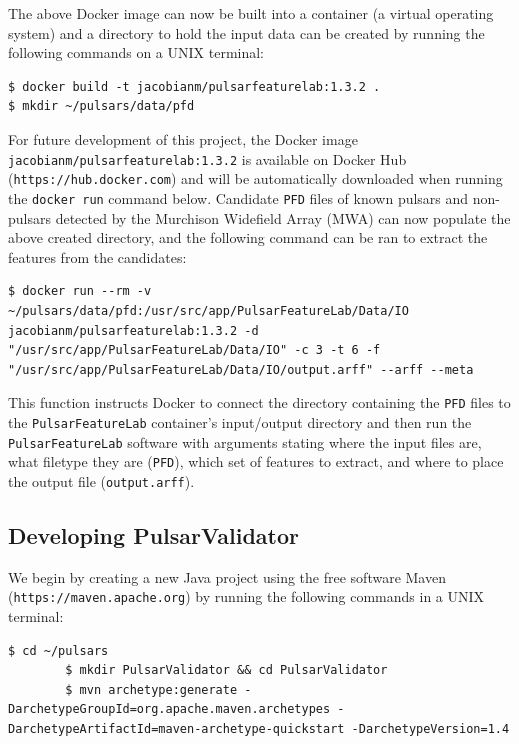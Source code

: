 \documentclass{article}
\begin{document}
\begin{appendices}
\begin{subappendices}
        The above Docker image can now be built into a container (a virtual operating system) and a directory to hold the input data can be created by running the following commands on a UNIX terminal:

        \begin{lstlisting}[numbers=none]
$ docker build -t jacobianm/pulsarfeaturelab:1.3.2 .
$ mkdir ~/pulsars/data/pfd
        \end{lstlisting}

        For future development of this project, the Docker image \\\verb|jacobianm/pulsarfeaturelab:1.3.2| is available on Docker Hub\\(\verb|https://hub.docker.com|) and will be automatically downloaded when running the \verb|docker run| command below. Candidate \verb|PFD| files of known pulsars and non-pulsars detected by the Murchison Widefield Array (MWA) can now populate the above created directory, and the following command can be ran to extract the features from the candidates:

        \begin{lstlisting}[numbers=none]
$ docker run --rm -v ~/pulsars/data/pfd:/usr/src/app/PulsarFeatureLab/Data/IO jacobianm/pulsarfeaturelab:1.3.2 -d "/usr/src/app/PulsarFeatureLab/Data/IO" -c 3 -t 6 -f "/usr/src/app/PulsarFeatureLab/Data/IO/output.arff" --arff --meta
        \end{lstlisting}

        This function instructs Docker to connect the directory containing the \verb|PFD| files to the \verb|PulsarFeatureLab| container's input/output directory and then run the \verb|PulsarFeatureLab| software with arguments stating where the input files are, what filetype they are (\verb|PFD|), which set of features to extract, and where to place the output file (\verb|output.arff|).

        \subsection{Developing PulsarValidator}
        \label{apndx:pulsarvalidator}
        We begin by creating a new Java project using the free software Maven (\verb|https://maven.apache.org|) by running the following commands in a UNIX terminal:

        \begin{lstlisting}[numbers=none]
        $ cd ~/pulsars
        $ mkdir PulsarValidator && cd PulsarValidator
        $ mvn archetype:generate -DarchetypeGroupId=org.apache.maven.archetypes -DarchetypeArtifactId=maven-archetype-quickstart -DarchetypeVersion=1.4
        \end{lstlisting}
        

\end{subappendices}
\end{appendices}
\end{document}
